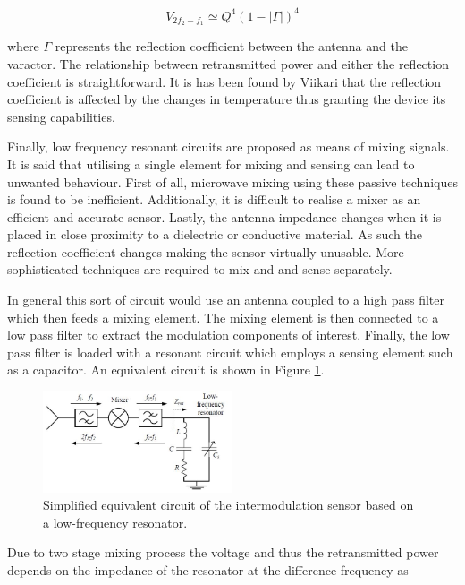 \documentclass[11pt,a4paper]{article}
\begin{document}
\begin{equation}
V_{2f_2-f_1} \simeq Q^4(1 - |\Gamma|)^4
\end{equation}

where $\Gamma$ represents the reflection coefficient between the antenna and the varactor. The relationship between retransmitted power and either the reflection coefficient is straightforward. It is has been found by Viikari that the reflection coefficient is affected by the changes in temperature thus granting the device its sensing capabilities.

Finally, low frequency resonant circuits are proposed as means of mixing signals. It is said that utilising a single element for mixing and sensing can lead to unwanted behaviour. First of all, microwave mixing using these passive techniques is found to be inefficient. Additionally, it is difficult to realise a mixer as an efficient and accurate sensor. Lastly, the antenna impedance changes when it is placed in close proximity to a dielectric or conductive material. As such the reflection coefficient changes making the sensor virtually unusable. More sophisticated techniques are required to mix and and sense separately.

In general this sort of circuit would use an antenna coupled to a high pass filter which then feeds a mixing element. The mixing element is then connected to a low pass filter to extract the modulation components of interest. Finally, the low pass filter is loaded with a resonant circuit which employs a sensing element such as a capacitor. An equivalent circuit is shown in Figure \ref{fig:lowf}.

\begin{figure}[h]
\centering
\includegraphics[width=0.5\textwidth]{low_f.JPG}
\caption{Simplified equivalent circuit of the intermodulation sensor based on a low-frequency resonator. \cite{rfidMEMS}\label{fig:lowf}}
\end{figure}

Due to two stage mixing process the voltage and thus the retransmitted power depends on the impedance of the resonator at the difference frequency as
\end{document}

